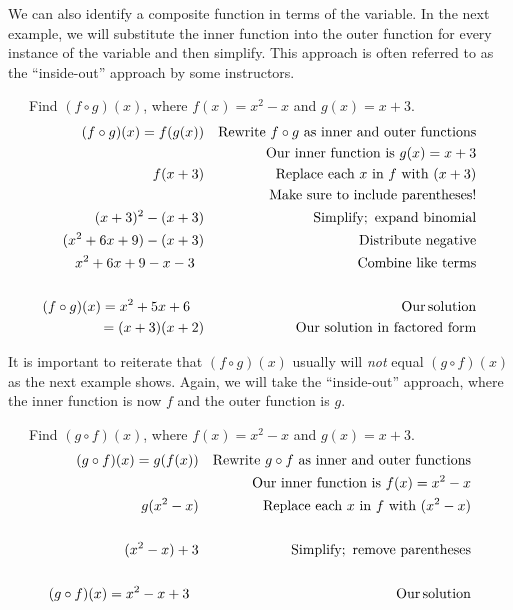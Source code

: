 We can also identify a composite function in terms of the variable. In the next example, we will substitute the inner function into the outer function for every instance of the variable and then simplify.  This approach is often referred to as the ``inside-out'' approach by some instructors.

\begin{example}\label{IO}~~~Find $(f \circ g) (x)$, where $f (x) = x^2 - x$ and $g (x) = x + 3$.
  \begin{eqnarray*}
    (f \circ g) (x)=f (g (x)) &  & \text{Rewrite~} f\circ g \text{~as~inner~and~outer~functions}\\
	    &  & \text{Our~inner~function~is~} g(x) = x + 3\\
    f (x + 3) &  & \text{Replace~each~} x \text{~in~} f \text{~with~} (x + 3)\\
		  &  & \text{Make~sure~to~include~parentheses!}\\
    (x + 3)^2 - (x + 3) &  & \operatorname{Simplify;~expand~binomial}\\
    (x^2 + 6 x + 9) - (x + 3) &  & \operatorname{Distribute~negative}\\
    x^2 + 6 x + 9 - x - 3~~ &  & \operatorname{Combine~like~terms}\\
    & & \\
		(f \circ g) (x)=x^2 + 5 x + 6~~~ &  & \operatorname{Our} \operatorname{solution}\\
		=(x+3)(x+2) & & \text{Our~solution~in~factored~form}
  \end{eqnarray*}
\end{example}

It is important to reiterate that $(f \circ g) (x)$ usually will \textit{not} equal $(g
\circ f) (x)$ as the next example shows.  Again, we will take the ``inside-out'' approach, where the inner function is now $f$ and the outer function is $g$.

\begin{example}~~~Find $(g \circ f) (x)$, where $f (x) = x^2 - x$ and $g (x) = x + 3$.
  \begin{eqnarray*}
    (g \circ f) (x)=g (f (x)) &  & \text{Rewrite~} g\circ f \text{~as~inner~and~outer~functions}\\
	    &  & \text{Our~inner~function~is~} f(x) = x^2 - x\\
    g (x^2 - x) &  & \text{Replace~each~} x \text{~in~} f \text{~with~} (x^2 - x)\\
		& & \\
    (x^2 - x) + 3 &  & \operatorname{Simplify;~remove~parentheses}\\
    & & \\
		(g \circ f) (x)=x^2 - x + 3~~ &  & \operatorname{Our} \operatorname{solution}
  \end{eqnarray*}
\end{example}

